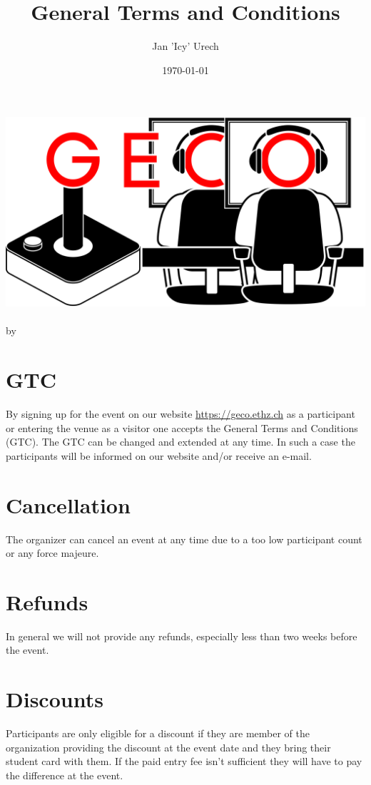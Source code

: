 \documentclass{article}
\title{General Terms and Conditions}
\author{Jan 'Icy' Urech}
\date{\today}
\begin{document}
\makeatletter
\begin{titlepage}
\centering
\includegraphics[scale=0.075]{GECo.png}\\
\LARGE \@title\\ \normalsize by \@author\\ \@date
\end{titlepage}
\makeatother


\clearpage

\tableofcontents
\clearpage


\section{GTC}
By signing up for the event on our website \url{https://geco.ethz.ch} as a participant or entering the venue as a visitor one accepts the General Terms and Conditions (GTC).
The GTC can be changed and extended at any time. In such a case the participants will be informed on our website and/or receive an e-mail.


\section{Cancellation}
The organizer can cancel an event at any time due to a too low participant count or any force majeure.

\section{Refunds}
In general we will not provide any refunds, especially less than two weeks before the event.

\section{Discounts}
Participants are only eligible for a discount if they are member of the organization providing the discount at the event date and they bring their student card with them. If the paid entry fee isn't sufficient they will have to pay the difference at the event.
\end{document}
